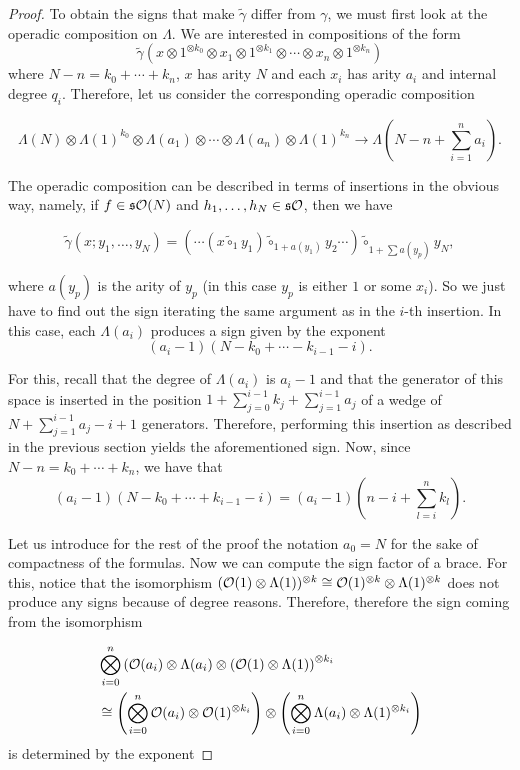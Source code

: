 \documentclass[Thesis.tex]{subfiles}
\begin{document}
\begin{proof}
To obtain the signs that make $\tilde{\gamma}$ differ from $\gamma$, we must first look at the operadic composition on $\Lambda$. 
We are interested in compositions of the form \[\tilde{\gamma}(x\otimes 1^{\otimes k_0}\otimes x_1\otimes 1^{\otimes k_1}\otimes\cdots\otimes x_n\otimes 1^{\otimes k_n})\] where $N-n=k_0+\cdots+k_n$, $x$ has arity $N$ and each $x_i$ has arity $a_i$ and internal degree $q_i$. Therefore, let us consider the corresponding operadic composition 

\[
\Lambda(N)\otimes\Lambda(1)^{k_0}\otimes\Lambda(a_1)\otimes\cdots\otimes\Lambda(a_n)\otimes\Lambda(1)^{k_n}\longrightarrow \Lambda\left(N-n+\sum_{i=1}^na_i\right).
\]

The operadic composition can be described in terms of insertions in the obvious way, namely, if $f\in\mathfrak{s}{\mathcal O}(N)$ and $h_1,\dots, h_N\in\mathfrak{s}{\mathcal O}$, then we have

\[\tilde{\gamma}(x;y_1,\dots, y_N)=(\cdots(x\tilde{\circ}_1 y_1)\tilde{\circ}_{1+a(y_1)}y_2\cdots)\tilde{\circ}_{1+\sum a(y_p)}y_N,\]

where $a(y_p)$ is the arity of $y_p$ (in this case $y_p$ is either $1$ or some $x_i$). So we just have to find out the sign iterating the same argument as in the $i$-th insertion. In this case, each $\Lambda(a_i)$ produces a sign given by the exponent $$(a_i-1)(N-k_0+\cdots-k_{i-1}-i).$$ 

For this, recall that the degree of $\Lambda(a_i)$ is $a_i-1$ and that the generator of this space is inserted in the position $1+\sum_{j=0}^{i-1}k_j+\sum_{j=1}^{i-1}a_j$ of a wedge of $N+\sum_{j=1}^{i-1}a_j-i+1$ generators. Therefore, performing this insertion as described in the previous section yields the aforementioned sign. Now, since $N-n=k_0+\cdots+k_n$, we have that
\[(a_i-1)(N-k_0+\cdots+k_{i-1}-i)=(a_i-1)\left(n-i+\sum_{l=i}^nk_l\right).\]

Let us introduce for the rest of the proof the notation $a_0 = N$ for the sake of compactness of the formulas. Now we can compute the sign factor of a brace. For this, notice that the isomorphism $({\mathcal O}(1)\otimes \Lambda(1))^{\otimes k}\cong {\mathcal O}(1)^{\otimes k}\otimes \Lambda(1)^{\otimes k}$ does not produce any signs because of degree reasons. Therefore, therefore the sign coming from the isomorphism

\begin{align*}
&\bigotimes_{i=0}^n\left({\mathcal O}(a_i)\otimes\Lambda(a_i)\otimes({\mathcal O}(1)\otimes\Lambda(1)\right)^{\otimes k_i}\\
&\cong \left(\bigotimes_{i=0}^n {\mathcal O}(a_i)\otimes {\mathcal O}(1)^{\otimes k_i}\right)\otimes \left(\bigotimes_{i=0}^n \Lambda(a_i)\otimes \Lambda(1)^{\otimes k_i}\right)
\end{align*}
is determined by the exponent


\end{proof}
\end{document}
